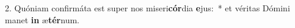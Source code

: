 2. Quóniam confirmáta est super nos miseri\textbf{cór}dia \textbf{e}jus:~*  et véritas Dómini manet \textbf{in} æ\textbf{tér}num.\

